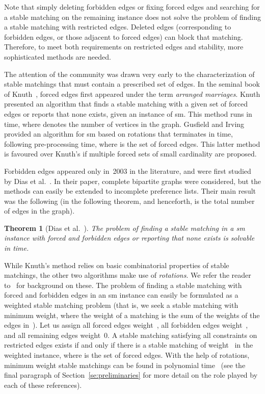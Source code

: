 \documentclass[preprint,12pt]{elsarticle}
\newtheorem{theorem}{Theorem}[section]
\begin{document}
Note that simply deleting forbidden edges or fixing forced edges and searching for a stable matching on the remaining instance does not solve the problem of finding a stable matching with restricted edges. Deleted edges (corresponding to forbidden edges, or those adjacent to forced edges) can block that matching. Therefore, to meet both requirements on restricted edges and stability, more sophisticated methods are needed.

The attention of the community was drawn very early to the characterization of stable matchings that must contain a prescribed set of edges. In the seminal book of Knuth~\cite{Knu76}, forced edges first appeared under the term \emph{arranged marriages}. Knuth presented an algorithm that finds a stable matching with a given set of forced edges or reports that none exists, given an instance of {\sc sm}. This method runs in  time, where  denotes the number of vertices in the graph. Gusfield and Irving~\cite{GI89} provided an algorithm for {\sc sm} based on rotations that terminates in  time, following  pre-processing time, where  is the set of forced edges. This latter method is favoured over Knuth's if multiple forced sets of small cardinality are proposed.

Forbidden edges appeared only in~2003 in the literature, and were first studied by Dias et al.~\cite{DFFS03}. In their paper, complete bipartite graphs were considered, but the methods can easily be extended to incomplete preference lists. Their main result was the following (in the following theorem, and henceforth,  is the total number of edges in the graph).

\begin{theorem}[Dias et al.~\cite{DFFS03}] 
\label{th:bip_decision} 
The problem of finding a stable matching in a  {\sc sm} instance with forced and forbidden edges or reporting that none exists is solvable in  time.
\end{theorem}

While Knuth's method relies on basic combinatorial properties of stable matchings, the other two algorithms make use of \emph{rotations}. We refer the reader to~\cite{GI89} for background on these. The problem of finding a stable matching with forced and forbidden edges in an {\sc sm} instance can easily be formulated as a weighted stable matching problem (that is, we seek a stable matching with minimum weight, where the weight of a matching  is the sum of the weights of the edges in~). Let us assign all forced edges weight~, all forbidden edges weight~, and all remaining edges weight~0. A stable matching satisfying all constraints on restricted edges exists if and only if there is a stable matching of weight~ in the weighted instance, where  is the set of forced edges. With the help of rotations, minimum weight stable matchings can be found in polynomial time~\cite{ILG87,Fed92,Rot92,Fed94} (see the final paragraph of Section~\ref{se:preliminaries} for more detail on the role played by each of these references).
\end{document}
